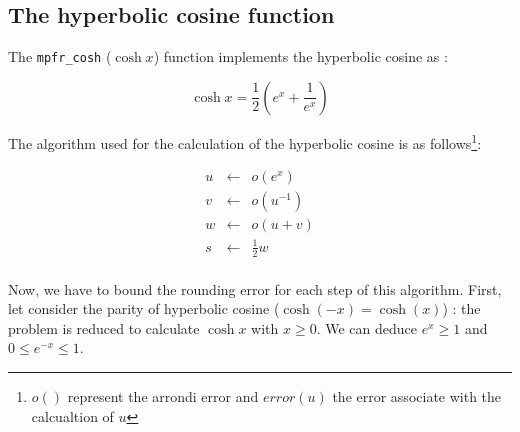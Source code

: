 \documentclass[12pt]{amsart}
\begin{document}
\subsection{The hyperbolic cosine function}

The {\tt mpfr\_cosh} ($\cosh{x}$) function implements the hyperbolic
cosine as :

$$
\cosh x = \frac{1}{2} \left( e^{x} + \frac{1}{e^x} \right) 
$$

The algorithm used for the calculation of the hyperbolic cosine is as follows\footnote{$o()$ represent the arrondi error and $error(u)$ the
  error associate with the calcualtion of $u$}:

\begin{eqnarray}\nonumber
u&\leftarrow&o(e^x)\\\label{coshalgo1}
v&\leftarrow&o({u}^{-1})\\\label{coshalgo2}
w&\leftarrow&o(u+v)\\\label{coshalgo3}
s&\leftarrow&\frac{1}{2} w\\\label{coshalgo4}
\end{eqnarray}

Now, we have to bound the rounding error for each step of this
algorithm.  First, let consider the parity of hyperbolic cosine
($\cosh(-x)=\cosh(x)$) : the problem is reduced to calculate $\cosh x$
with $x \geq 0$. We can deduce $e^x \geq 1$ and $0 \leq e^{-x} \leq
1$.
\end{document}
